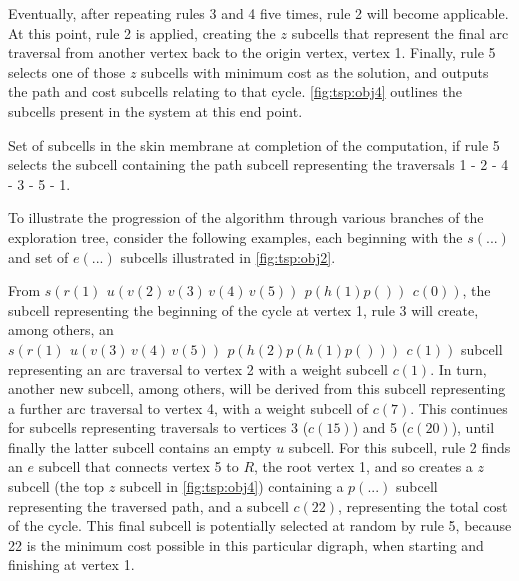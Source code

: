 Eventually, after repeating rules 3 and 4 five times, rule 2 will become applicable.  At this point, rule 2 is applied, creating the \(z\) subcells that represent the final arc traversal from another vertex back to the origin vertex, vertex 1.  Finally, rule 5 selects one of those \(z\) subcells with minimum cost as the solution, and outputs the path and cost subcells relating to that cycle.  \cref{fig:tsp:obj4} outlines the subcells present in the system at this end point.

\begin{cpobjectsfloat}
\begin{cpobjects}
\end{cpobjects}
\caption[Set of subcells in the skin membrane at completion of the computation]{\label{fig:tsp:obj4}Set of subcells in the skin membrane at completion of the computation, if rule 5 selects the subcell containing the path subcell representing the traversals 1 - 2 - 4 - 3 - 5 - 1.}
\end{cpobjectsfloat}

To illustrate the progression of the algorithm through various branches of the exploration tree, consider the following examples, each beginning with the \(s(...)\) and set of \(e(...)\) subcells illustrated in \cref{fig:tsp:obj2}.

From \(s(r(1) ~ \,u(v(2)\,v(3)\,v(4)\,v(5))\, ~ p(h(1)p()) ~ \,c(0))\), the subcell representing the beginning of the cycle at vertex 1, rule 3 will create, among others, an \(s(r(1) ~ \,u(v(3)\,v(4)\,v(5)) ~ \,p(h(2)p(h(1)p())) ~ \,c(1))\) subcell representing an arc traversal to vertex 2 with a weight subcell \(c(1)\).  In turn, another new subcell, among others, will be derived from this subcell representing a further arc traversal to vertex 4, with a weight subcell of \(c(7)\).  This continues for subcells representing traversals to vertices 3 (\(c(15)\)) and 5 (\(c(20)\)), until finally the latter subcell contains an empty \(u\) subcell.  For this subcell, rule 2 finds an \(e\) subcell that connects vertex 5 to \(R\), the root vertex 1, and so creates a \(z\) subcell (the top \(z\) subcell in \cref{fig:tsp:obj4}) containing a \(p(...)\) subcell representing the traversed path, and a subcell \(c(22)\), representing the total cost of the cycle.  This final subcell is potentially selected at random by rule 5, because 22 is the minimum cost possible in this particular digraph, when starting and finishing at vertex 1.

